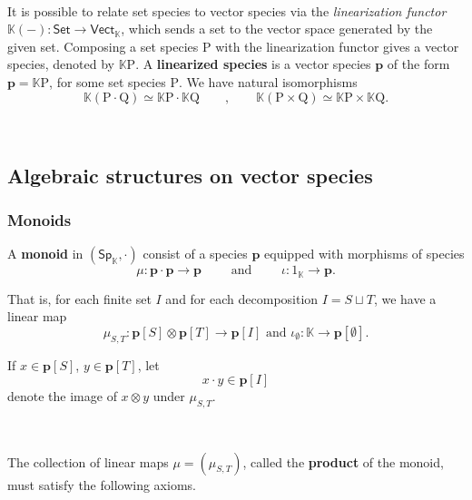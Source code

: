 \documentclass[12pt, reqno]{amsart}
\theoremstyle{definition}
\newcommand{\Vect}{\mathsf{Vect}}
\newcommand{\Set}{\mathsf{Set}}
\newcommand{\Ssk}{\mathsf{Sp}_\Kb} %
\newcommand{\Kb}{\mathbb{K}}
\newcommand{\rP}{\mathrm{P}}
\newcommand{\rQ}{\mathrm{Q}}
\newcommand{\tp}{\mathbf{p}}
\begin{document}
\

It is possible to relate set species to vector species via the \emph{linearization functor} $\mathbb{K}(-): \Set \to \Vect_{\mathbb{K}}$, which sends a set to the vector space generated by the given set. Composing a set species $\rP$ with the linearization functor gives a vector species, denoted by $\mathbb{K}\rP$. A {\bf linearized species} is a vector species $\tp$ of the form $\tp=\mathbb{K}\rP$, for some set species $\rP$. We have natural isomorphisms
 \[\mathbb{K}(\rP \cdot \rQ)\simeq \mathbb{K}\rP \cdot \mathbb{K}\rQ \qquad , \qquad \mathbb{K}(\rP \times \rQ)\simeq \mathbb{K}\rP \times \mathbb{K}\rQ.\]

\

\subsection{Algebraic structures on vector species}


\subsubsection{Monoids}
A {\bf monoid} in $(\Ssk, \cdot)$  consist of a species $\tp$ equipped with morphisms of species
\begin{equation*}
    \mu: \tp \cdot \tp \to \tp \qquad \text{ and } \qquad \iota: \mathrm{1}_{\mathbb{K}} \to \tp.
\end{equation*}

That is, for each finite set $I$ and for each decomposition $I=S \sqcup T$, we have a linear map 
\begin{equation*}
    \mu_{S,T}: \tp[S] \otimes \tp[T]\to \tp[I] \text{ and } \iota_\emptyset: \mathbb{K} \to \tp[\emptyset].
\end{equation*}

If $x \in \tp[S]$, $y \in \tp[T]$,  let 
\[x \cdot y \in \tp[I]\]
denote the image of $x\otimes y$ under $\mu_{S,T}$. 

\

The collection of linear maps $\mu=(\mu_{S,T})$, called the {\bf product} of the monoid, must satisfy the following axioms.

\
\end{document}
